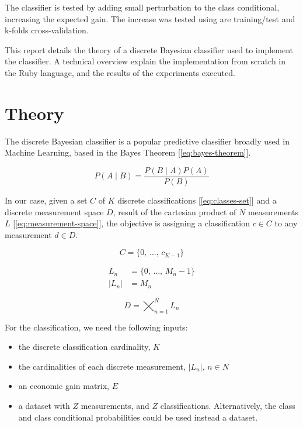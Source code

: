 \documentclass[letterpaper, conference]{IEEEtran}
\begin{document}
The classifier is tested by adding small perturbation to the class conditional, increasing the expected gain. The increase was tested using are training/test and k-folds cross-validation.

This report details the theory of a discrete Bayesian classifier used to implement the classifier. A technical overview explain the implementation from scratch in the Ruby language, and the results of the experiments executed.

\section{Theory}

The discrete Bayesian classifier is a popular predictive classifier broadly used in Machine Learning, based in the Bayes Theorem [\ref{eq:bayes-theorem}].

\begin{equation}\label{eq:bayes-theorem}
  P(A \mid B) = \frac{P(B \mid A)\mathbin{}P(A)}{P(B)}
\end{equation}

In our case, given a set $C$ of $K$ discrete classifications [\ref{eq:classes-set}] and a discrete measurement space $D$, result of the cartesian product of $N$ measurements $L$ [\ref{eq:measurement-space}], the objective is assigning a classification $c \in C$ to any measurement $d \in D$.

\begin{equation}\label{eq:classes-set}
C = \{0,\, \dots,\, c_{K - 1}\}
\end{equation}

\begin{equation} \label{eq:measurement-set}
\begin{aligned}
  L_n &= \{0,\, \dots,\, M_{n} - 1\} \\
  \vert L_n \vert &= M_n
\end{aligned}
\end{equation}

\begin{equation} \label{eq:measurement-space}
D = \bigtimes_{n=1}^{N} L_n
\end{equation}

For the classification, we need the following inputs:
\begin{itemize}
  \item the discrete classification cardinality, $K$
  \item the cardinalities of each discrete measurement, $\vert L_n \vert,\, n \in N$
  \item an economic gain matrix, $E$
  \item a dataset with $Z$ measurements, and $Z$ classifications. Alternatively, the class and class conditional probabilities could be used instead a dataset.
\end{itemize}
\end{document}
